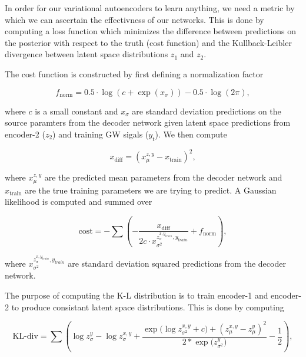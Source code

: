 \documentclass[%
showpacs,
 amsmath,amssymb,
 aps,
 twocolumn,
 prl,
 reprint,
floatfix,
]{revtex4-1}
\begin{document}
%
%
In order for our variational autoencoders to learn anything, we need a metric by which 
we can ascertain the effectivness of our networks. This is done by computing 
a loss function which minimizes the difference 
between predictions on the posterior with respect to the truth (cost function) and the Kullback-Leibler divergence 
between latent space distributions $z_1$ and $z_2$. 

%
%
The cost function is constructed by first defining a normalization factor

\begin{equation}
    f_{\textrm{norm}} = 0.5 \cdot \log(c + \exp(x_{\sigma})) - 0.5 \cdot \log(2\pi),
\end{equation}

where $c$ is a small constant and $x_{\sigma}$ are standard deviation predictions 
on the source paramters from the decoder network given latent space predictions 
from encoder-2 ($z_2$) and training GW sigals ($y_{t}$). We then 
compute 

\begin{equation}
    x_{\textrm{diff}} = (x^{z,y}_{\mu} - x_{\textrm{train}})^{2},
\end{equation}

where $x^{z,y}_{\mu}$ are the predicted mean parameters from the decoder network 
and $x_{\textrm{train}}$ are the true training parameters we are 
trying to predict. A Gaussian likelihood is computed and summed over

\begin{equation}
    \textrm{cost} = - \sum (-\frac{x_{\textrm{diff}}}{2c \cdot 
    x^{z^{x,y_{train}}_{\sigma},y_{train}}_{\sigma^{2}}} + f_{\textrm{norm}}),\label{eq:cost}
\end{equation}

where $x^{z^{x,y_{train}}_{\sigma},y_{train}}_{\sigma^{2}}$ are standard deviation squared predictions from the 
decoder network.


%
%
The purpose of computing the K-L distribution is to train 
encoder-1 and encoder-2 to produce consistant latent space 
distributions. This is done by computing 

\begin{equation}
    \textrm{KL-div} = \sum(\log{z^{y}_{\sigma}}-\log{z^{x,y}_{\sigma}}
    +\frac{\exp{(\log{z^{x,y}_{\sigma^{2}}+c)}}+(z^{x,y}_{\mu}-z^{y}_{\mu})^{2}}{2*\exp{(z^{y}_{\sigma^{2}}})}
    -\frac{1}{2}),\label{eq:kl}
\end{equation}
\end{document}
